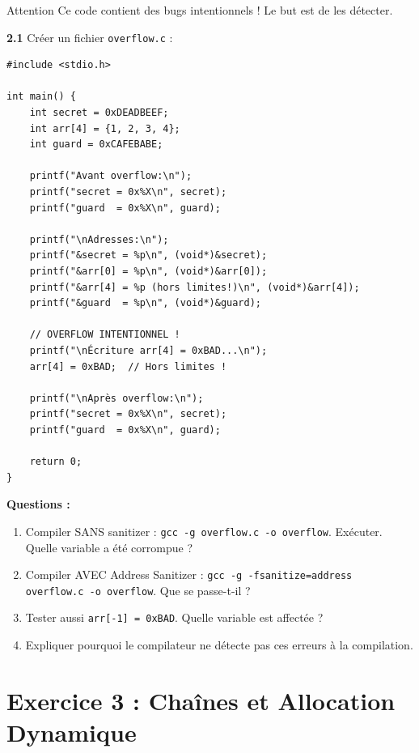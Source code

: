 \documentclass[10pt,a4paper]{article}
\begin{document}
\begin{warningbox}{Attention}
Ce code contient des bugs intentionnels ! Le but est de les détecter.
\end{warningbox}

\textbf{2.1} Créer un fichier \texttt{overflow.c} :

\begin{lstlisting}
#include <stdio.h>

int main() {
    int secret = 0xDEADBEEF;
    int arr[4] = {1, 2, 3, 4};
    int guard = 0xCAFEBABE;
    
    printf("Avant overflow:\n");
    printf("secret = 0x%X\n", secret);
    printf("guard  = 0x%X\n", guard);
    
    printf("\nAdresses:\n");
    printf("&secret = %p\n", (void*)&secret);
    printf("&arr[0] = %p\n", (void*)&arr[0]);
    printf("&arr[4] = %p (hors limites!)\n", (void*)&arr[4]);
    printf("&guard  = %p\n", (void*)&guard);
    
    // OVERFLOW INTENTIONNEL !
    printf("\nÉcriture arr[4] = 0xBAD...\n");
    arr[4] = 0xBAD;  // Hors limites !
    
    printf("\nAprès overflow:\n");
    printf("secret = 0x%X\n", secret);
    printf("guard  = 0x%X\n", guard);
    
    return 0;
}
\end{lstlisting}

\textbf{Questions :}
\begin{enumerate}[label=\alph*)]
    \item Compiler SANS sanitizer : \texttt{gcc -g overflow.c -o overflow}. Exécuter. Quelle variable a été corrompue ?
    \item Compiler AVEC Address Sanitizer : \texttt{gcc -g -fsanitize=address overflow.c -o overflow}. Que se passe-t-il ?
    \item Tester aussi \texttt{arr[-1] = 0xBAD}. Quelle variable est affectée ?
    \item Expliquer pourquoi le compilateur ne détecte pas ces erreurs à la compilation.
\end{enumerate}

\section{Exercice 3 : Chaînes et Allocation Dynamique}
\end{document}
